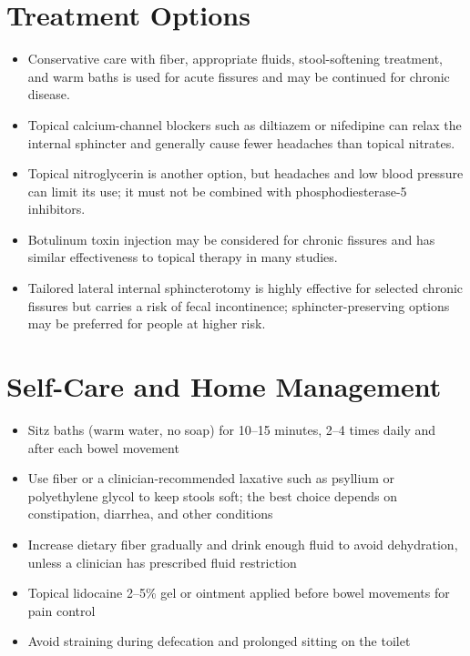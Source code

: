 \section*{Treatment Options}
\begin{itemize}
 \item Conservative care with fiber, appropriate fluids, stool-softening treatment, and warm baths is used for acute fissures and may be continued for chronic disease.
 \item Topical calcium-channel blockers such as diltiazem or nifedipine can relax the internal sphincter and generally cause fewer headaches than topical nitrates.
 \item Topical nitroglycerin is another option, but headaches and low blood pressure can limit its use; it must not be combined with phosphodiesterase-5 inhibitors.
 \item Botulinum toxin injection may be considered for chronic fissures and has similar effectiveness to topical therapy in many studies.
 \item Tailored lateral internal sphincterotomy is highly effective for selected chronic fissures but carries a risk of fecal incontinence; sphincter-preserving options may be preferred for people at higher risk.
\end{itemize}

\section*{Self-Care and Home Management}
\begin{itemize}
 \item Sitz baths (warm water, no soap) for 10--15 minutes, 2--4 times daily and after each bowel movement
 \item Use fiber or a clinician-recommended laxative such as psyllium or polyethylene glycol to keep stools soft; the best choice depends on constipation, diarrhea, and other conditions
 \item Increase dietary fiber gradually and drink enough fluid to avoid dehydration, unless a clinician has prescribed fluid restriction
 \item Topical lidocaine 2--5\% gel or ointment applied before bowel movements for pain control
 \item Avoid straining during defecation and prolonged sitting on the toilet
\end{itemize}

